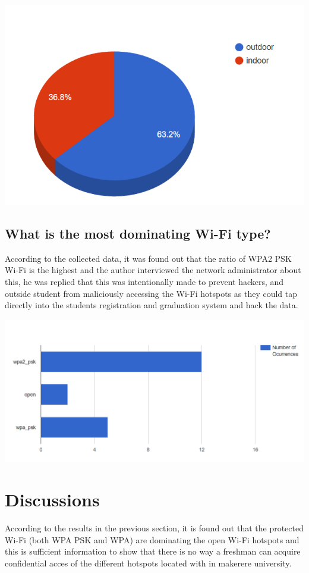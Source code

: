\documentclass[14pt, a4paper]{article}
\begin{document}
\includegraphics{io}

			\subsection{What is the most dominating Wi-Fi type?}
According to the collected data, it was found out that the ratio of WPA2 PSK Wi-Fi is the highest and the author interviewed the network administrator about this, he was replied that this was intentionally made to prevent hackers, and outside student from maliciously accessing the Wi-Fi hotspots as they could tap directly into the students registration and graduation system and hack the data.

\includegraphics{wt}


			\section{Discussions}
According to the results in the previous section, it is found out that the protected Wi-Fi (both WPA PSK and WPA) are dominating the open Wi-Fi hotspots and this is sufficient information to show that there is no way a freshman can acquire confidential acces of the different hotspots located with in makerere university.\\
\end{document}
